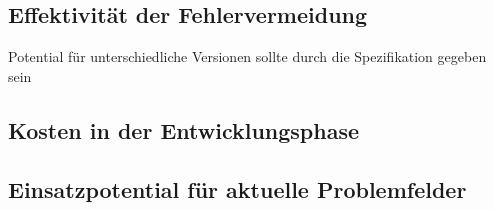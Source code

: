 

\subsection{Effektivität der Fehlervermeidung}\label{bewertung-potential}
Potential für unterschiedliche Versionen sollte durch die Spezifikation gegeben sein 

\subsection{Kosten in der Entwicklungsphase}\label{bewertung-kosten}

\subsection{Einsatzpotential für aktuelle Problemfelder}\label{bewertung-relevanz}